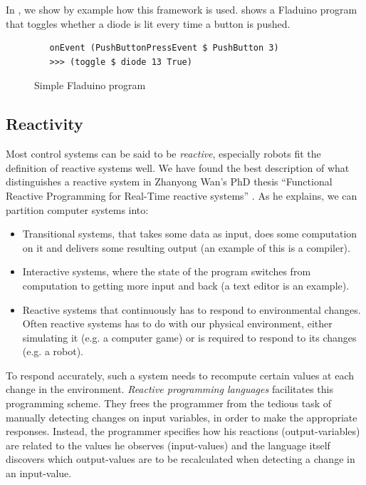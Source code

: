 \documentclass[a4paper, oneside, final]{memoir}
\let\fref\undefined
\let\Fref\undefined
\begin{document}
In \fref[plain]{sec:pushbuttondef}, we show by example how this framework is
used. \Fref{fig:fladuino-simple} shows a Fladuino program that toggles
whether a diode is lit every time a button is pushed.

\begin{figure}
  \centering

\begin{verbatim}
   onEvent (PushButtonPressEvent $ PushButton 3)  
   >>> (toggle $ diode 13 True)
\end{verbatim}  

  \caption{Simple Fladuino program}
  \label{fig:fladuino-simple}
\end{figure}

\subsection{Reactivity}

Most control systems can be said to be \textit{reactive}, especially
robots fit the definition of reactive systems well.  We have found the
best description of what distinguishes a reactive system in Zhanyong
Wan's PhD thesis ``Functional Reactive Programming for Real-Time
reactive systems'' \cite{Chambers1992}.  As he explains, we can
partition computer systems into:
\begin{itemize}
\item Transitional systems, that takes some data as input, does some
  computation on it and delivers some resulting output (an example of this
  is a compiler).
\item Interactive systems, where the state of the program switches
  from computation to getting more input and back (a text editor is an
  example).
\item Reactive systems that continuously has to respond to
  environmental changes. Often reactive systems has to do with our
  physical environment, either simulating it (e.g. a computer game) or
  is required to respond to its changes (e.g. a robot).
\end{itemize}

To respond accurately, such a system needs to recompute certain values
at each change in the environment. \textit{Reactive programming
  languages} facilitates this programming scheme. They frees the
programmer from the tedious task of manually detecting changes on
input variables, in order to make the appropriate
responses. Instead, the programmer specifies how his reactions
(output-variables) are related to the values he observes
(input-values) and the language itself discovers which output-values
are to be recalculated when detecting a change in an input-value.
\end{document}
